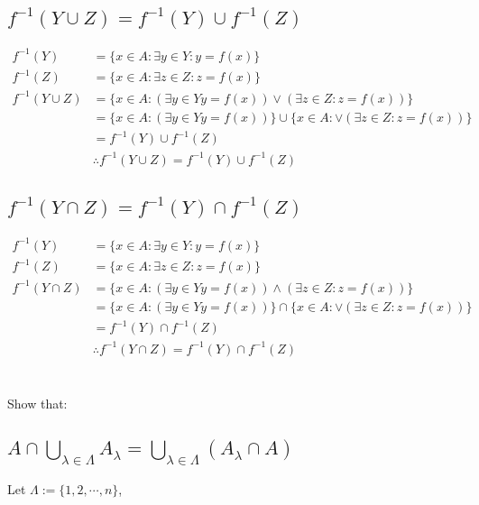 \documentclass[]{article}
\begin{document}
\newpage
\subsection{$f^{-1}(Y \cup Z) = f^{-1}(Y) \cup f^{-1}(Z)$}
\begin{align*}
	f^{-1}(Y) &= \{x \in A : \exists y \in Y : y = f(x)\}\\
	f^{-1}(Z) &= \{x \in A : \exists z \in Z : z = f(x)\}\\
	f^{-1}(Y \cup Z) &= \{x \in A : (\exists y \in Y y = f(x))
		\lor (\exists z \in Z : z = f(x))\}\\
	&= \{x \in A : (\exists y \in Y y = f(x))\} 
		\cup \{x \in A :\lor (\exists z \in Z : z = f(x))\}\\
	&= f^{-1}(Y) \cup f^{-1}(Z)\\
	&\therefore f^{-1}(Y \cup Z) = f^{-1}(Y) \cup f^{-1}(Z)
\end{align*}

\subsection{$f^{-1}(Y \cap Z) = f^{-1}(Y) \cap f^{-1}(Z)$}
\begin{align*}
	f^{-1}(Y) &= \{x \in A : \exists y \in Y : y = f(x)\}\\
	f^{-1}(Z) &= \{x \in A : \exists z \in Z : z = f(x)\}\\
	f^{-1}(Y \cap Z) &= \{x \in A : (\exists y \in Y y = f(x))
		\land (\exists z \in Z : z = f(x))\}\\
	&= \{x \in A : (\exists y \in Y y = f(x))\} 
		\cap \{x \in A :\lor (\exists z \in Z : z = f(x))\}\\
	&= f^{-1}(Y) \cap f^{-1}(Z)\\
	&\therefore f^{-1}(Y \cap Z) = f^{-1}(Y) \cap f^{-1}(Z)
\end{align*}




\newpage
\section{}
Show that:

\subsection{
	$A \cap \bigcup\limits_{\lambda \in \Lambda}  A_\lambda 
	= \bigcup\limits_{\lambda \in \Lambda} (A_\lambda \cap A)$
}

Let $\Lambda := \{1, 2, \cdots, n\}$,
\end{document}
